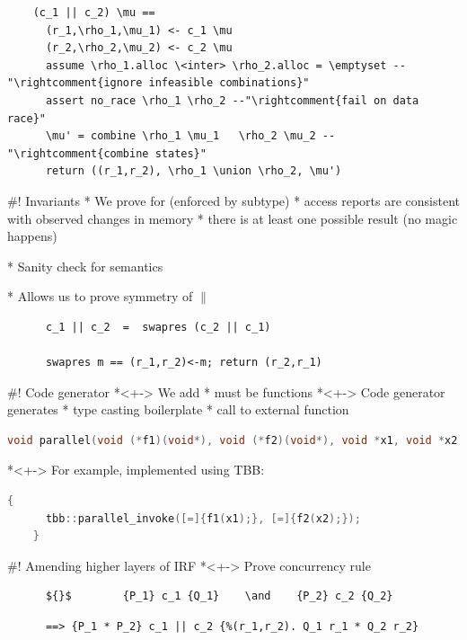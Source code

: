 \documentclass[fleqn]{beamer}
\begin{document}
  \onslide<+->
  \begin{lstlisting}
    (c_1 || c_2) \mu ==
      (r_1,\rho_1,\mu_1) <- c_1 \mu
      (r_2,\rho_2,\mu_2) <- c_2 \mu
      assume \rho_1.alloc \<inter> \rho_2.alloc = \emptyset --"\rightcomment{ignore infeasible combinations}"
      assert no_race \rho_1 \rho_2 --"\rightcomment{fail on data race}"
      \mu' = combine \rho_1 \mu_1   \rho_2 \mu_2 --"\rightcomment{combine states}"
      return ((r_1,r_2), \rho_1 \union \rho_2, \mu')

  \end{lstlisting}

#! Invariants
  * We prove for  (enforced by subtype)
    * access reports are consistent with observed changes in memory
    * there is at least one possible result (no magic happens)

  * Sanity check for semantics

  * Allows us to prove symmetry of $\parallel$
    \begin{lstlisting}
      c_1 || c_2  =  swapres (c_2 || c_1)

      swapres m == (r_1,r_2)<-m; return (r_2,r_1)
    \end{lstlisting}

#! Code generator
  *<+-> We add 
    *  must be functions
  *<+-> Code generator generates
    * type casting boilerplate
    * call to external  function

    {\small
    \begin{lstlisting}[language=C++]
    void parallel(void (*f1)(void*), void (*f2)(void*), void *x1, void *x2)
    \end{lstlisting}
    }
  *<+-> For example, implemented using TBB:
    {\small
    \begin{lstlisting}[language=C++]
    {
      tbb::parallel_invoke([=]{f1(x1);}, [=]{f2(x2);});
    }
    \end{lstlisting}
    }



#! Amending higher layers of IRF
  *<+-> Prove concurrency rule
    \begin{lstlisting}
      ${}$        {P_1} c_1 {Q_1}    \and    {P_2} c_2 {Q_2}
    \end{lstlisting}

    \vspace*{-.8em}
    \begin{lstlisting}
      ==> {P_1 * P_2} c_1 || c_2 {%(r_1,r_2). Q_1 r_1 * Q_2 r_2}
    \end{lstlisting}
\end{document}
